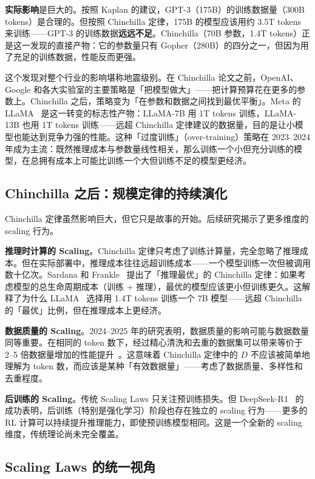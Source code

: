 \textbf{实际影响}是巨大的。按照 Kaplan 的建议，GPT-3（175B）的训练数据量（300B tokens）是合理的。但按照 Chinchilla 定律，175B 的模型应该用约 3.5T tokens 来训练——GPT-3 的训练数据\textbf{远远不足}。Chinchilla（70B 参数，1.4T tokens）正是这一发现的直接产物：它的参数量只有 Gopher（280B）的四分之一，但因为用了充足的训练数据，性能反而更强。

这个发现对整个行业的影响堪称地震级别。在 Chinchilla 论文之前，OpenAI、Google 和各大实验室的主要策略是「把模型做大」——把计算预算花在更多的参数上。Chinchilla 之后，策略变为「在参数和数据之间找到最优平衡」。Meta 的 LLaMA~\cite{touvron2023llama} 是这一转变的标志性产物：LLaMA-7B 用 1T tokens 训练，LLaMA-13B 也用 1T tokens 训练——远超 Chinchilla 定律建议的数据量，目的是让小模型也能达到竞争力强的性能。这种「过度训练」（over-training）策略在 2023--2024 年成为主流：既然推理成本与参数量线性相关，那么训练一个小但充分训练的模型，在总拥有成本上可能比训练一个大但训练不足的模型更经济。

\subsection{Chinchilla 之后：规模定律的持续演化}

Chinchilla 定律虽然影响巨大，但它只是故事的开始。后续研究揭示了更多维度的 scaling 行为。

\textbf{推理时计算的 Scaling}。Chinchilla 定律只考虑了训练计算量，完全忽略了推理成本。但在实际部署中，推理成本往往远超训练成本——一个模型训练一次但被调用数十亿次。Sardana 和 Frankle~\cite{sardana2024chinchilla} 提出了「推理最优」的 Chinchilla 定律：如果考虑模型的总生命周期成本（训练 + 推理），最优的模型应该更小但训练更久。这解释了为什么 LLaMA~\cite{touvron2023llama} 选择用 1.4T tokens 训练一个 7B 模型——远超 Chinchilla 的「最优」比例，但在推理成本上更经济。

\textbf{数据质量的 Scaling}。2024--2025 年的研究表明，数据质量的影响可能与数据数量同等重要。在相同的 token 数下，经过精心清洗和去重的数据集可以带来等价于 2--5 倍数据量增加的性能提升~\cite{penedo2024fineweb}。这意味着 Chinchilla 定律中的 $D$ 不应该被简单地理解为 token 数，而应该是某种「有效数据量」——考虑了数据质量、多样性和去重程度。

\textbf{后训练的 Scaling}。传统 Scaling Laws 只关注预训练损失。但 DeepSeek-R1~\cite{deepseekr1} 的成功表明，后训练（特别是强化学习）阶段也存在独立的 scaling 行为——更多的 RL 计算可以持续提升推理能力，即使预训练模型相同。这是一个全新的 scaling 维度，传统理论尚未完全覆盖。

\subsection{Scaling Laws 的统一视角}

